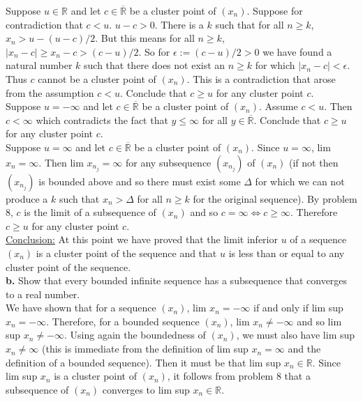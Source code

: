 \documentclass[a4paper]{article}
\begin{document}
Suppose $u \in \mathbb{R}$ and let $c \in \overline{\mathbb{R}}$ be a cluster point of $(x_n)$. Suppose for contradiction that $c<u$. $u-c>0$. There is a $k$ such that for all $n\geq k$, $x_n > u - (u-c)/2$. But this means for all $n\geq k$, $|x_n - c| \geq x_n - c > (c-u)/2$. So for $\epsilon := (c-u)/2 >0$ we have found a natural number $k$ such that there does not exist an $n\geq k$ for which $|x_n-c| < \epsilon$. Thus $c$ cannot be a cluster point of $(x_n)$. This is a contradiction that arose from the assumption $c<u$. Conclude that $c \geq u$ for any cluster point $c$. \\

Suppose $u =-\infty$ and let $c \in \overline{\mathbb{R}}$ be a cluster point of $(x_n)$. Assume $c<u$. Then $c<\infty$ which contradicts the fact that $y\leq \infty$ for all $y \in \overline{\mathbb{R}}$. Conclude that $c\geq u$ for any cluster point $c$. \\

Suppose $u =\infty$ and let $c \in \overline{\mathbb{R}}$ be a cluster point of $(x_n)$. Since $u = \infty$, lim $x_n = \infty$. Then lim $x_{n_j} = \infty$ for any subsequence $(x_{n_j})$ of $(x_n)$ (if not then $(x_{n_j})$ is bounded above and so there must exist some $\Delta$ for which we can not produce a $k$ such that $x_n > \Delta$ for all $n\geq k$ for the original sequence). By problem 8, $c$ is the limit of a subsequence of $(x_n)$ and so $c = \infty \iff c\geq \infty$. Therefore $c\geq u$ for any cluster point $c$. \\

\underline{Conclusion:} At this point we have proved that the limit inferior $u$ of a sequence $(x_n)$ is a cluster point of the sequence and that $u$ is less than or equal to any cluster point of the sequence. \\

{\bf b.} Show that every bounded infinite sequence has a subsequence that converges to a real number.\\

We have shown that for a sequence $(x_n)$, lim $x_n = -\infty$ if and only if lim sup $x_n = -\infty$. Therefore, for a bounded sequence $(x_n)$, lim $x_n \neq -\infty$ and so lim sup $x_n \neq -\infty$. Using again the boundedness of $(x_n)$, we must also have lim sup $x_n \neq \infty$ (this is immediate from the definition of lim sup $x_n = \infty$ and the definition of a bounded sequence). Then it must be that lim sup $x_n \in \mathbb{R}$. Since lim sup $x_n$ is a cluster point of $(x_n)$, it follows from problem 8 that a subsequence of $(x_n)$ converges to lim sup $x_n \in \mathbb{R}$.\\
\end{document}
